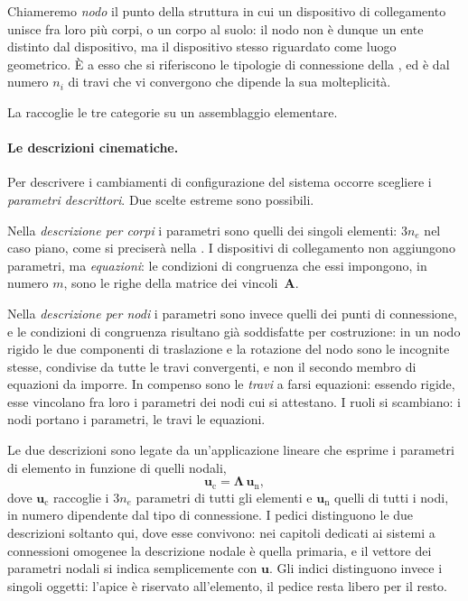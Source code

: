 Chiameremo \emph{nodo} il punto della struttura in cui un
dispositivo di collegamento unisce fra loro più corpi, o un
corpo al suolo: il nodo non è dunque un ente distinto dal
dispositivo, ma il dispositivo stesso riguardato come luogo
geometrico. È a esso che si riferiscono le tipologie di
connessione della , ed è dal numero
$n_i$ di travi che vi convergono che dipende la sua
molteplicità.

	La  raccoglie le tre
categorie su un assemblaggio elementare.






\paragraph{Le descrizioni cinematiche.}
Per descrivere i cambiamenti di configurazione del
sistema occorre scegliere i \emph{parametri descrittori}.
Due scelte estreme sono possibili.

Nella \emph{descrizione per corpi} i parametri sono quelli
dei singoli elementi: $3n_e$ nel caso piano, come si
preciserà nella . I dispositivi di
collegamento non aggiungono parametri, ma
\emph{equazioni}: le condizioni di congruenza che essi
impongono, in numero $m$, sono le righe della matrice dei
vincoli~$\bm{A}$.

Nella \emph{descrizione per nodi} i parametri sono invece
quelli dei punti di connessione, e le condizioni di
congruenza risultano già soddisfatte per costruzione: in
un nodo rigido le due componenti di traslazione e la
rotazione del nodo sono le incognite stesse, condivise da
tutte le travi convergenti, e non il secondo membro di
equazioni da imporre. In compenso sono le \emph{travi} a
farsi equazioni: essendo rigide, esse vincolano fra loro i
parametri dei nodi cui si attestano. I ruoli si scambiano:
i nodi portano i parametri, le travi le equazioni.

Le due descrizioni sono legate da un'applicazione lineare
che esprime i parametri di elemento in funzione di quelli
nodali,
\begin{equation}\label{eq:mappa_descrizioni}
	\bm{u}_{\mathrm{c}} = \bm{\Lambda}\,\bm{u}_{\mathrm{n}} ,
\end{equation}
dove $\bm{u}_{\mathrm{c}}$ raccoglie i $3n_e$ parametri di
tutti gli elementi e $\bm{u}_{\mathrm{n}}$ quelli di tutti i
nodi, in numero dipendente dal tipo di connessione. I pedici
distinguono le due descrizioni soltanto qui, dove esse
convivono: nei capitoli dedicati ai sistemi a connessioni
omogenee la descrizione nodale è quella primaria, e il
vettore dei parametri nodali si indica semplicemente con
$\bm{u}$.
Gli indici distinguono invece i singoli oggetti: l'apice è riservato all'elemento, il pedice resta libero per il resto.


